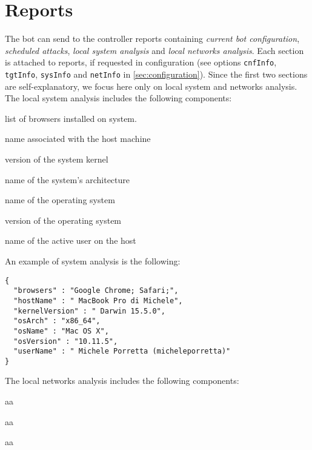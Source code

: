 \section{Reports}
\label{sec:reports}

The bot can send to the controller reports containing \textit{current bot configuration}, \textit{scheduled attacks}, \textit{local system analysis} and \textit{local networks analysis}. Each section is attached to reports, if requested in configuration (see options \texttt{cnfInfo}, \texttt{tgtInfo}, \texttt{sysInfo} and \texttt{netInfo} in \ref{sec:configuration}). Since the first two sections are self-explanatory, we focus here only on local system and networks analysis.\\

The local system analysis includes the following components:
\begin{description}
  \setlength\itemsep{1em}
    \item [browsers] list of browsers installed on system.
	\item [hostName] name associated with the host machine
	\item [kernelVersion] version of the system kernel
	\item [osArch] name of the system's architecture
  	\item [osName] name of the operating system
  	\item [osVersion] version of the operating system
  	\item [userName] name of the active user on the host
\end{description}
\;

An example of system analysis is the following:
\begin{verbatim}
{
  "browsers" : "Google Chrome; Safari;",
  "hostName" : " MacBook Pro di Michele",
  "kernelVersion" : " Darwin 15.5.0",
  "osArch" : "x86_64",
  "osName" : "Mac OS X",
  "osVersion" : "10.11.5",
  "userName" : " Michele Porretta (micheleporretta)"
}
\end{verbatim}

The local networks analysis includes the following components:

\begin{description}
  \setlength\itemsep{1em}
  \item [Item1] aa
  \item [Item2] aa
  \item [Item3] aa
\end{description}
